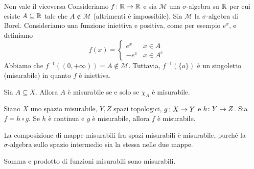 \documentclass[a4paper]{article}
\begin{document}
\begin{radioactive}
\begin{snippetexample}{Non vale il viceversa}
    Consideriamo \(f \colon \mathbb{R} \to \mathbb{R}\)
    e sia \(\mathcal M\) una \(\sigma\)-algebra
    su \(\mathbb{R}\) per cui esiste \(A\subseteq\mathbb{R}\) tale che \(A \notin \mathcal M\) (altrimenti è impossibile).
    Sia \(\mathcal M\) la \(\sigma\)-algebra di Borel.
    Consideriamo una funzione iniettiva e positiva, come per esempio \(e^x\), e definiamo
    \[
        f(x) =
        \begin{cases}
            e^x & x \in A \\
            -e^x & x \in A^c
        \end{cases}
    \]
    Abbiamo che \(f^{-1}((0, +\infty)) = A \notin \mathcal M\).
    Tuttavia, \(f^{-1}(\{a\})\) è un singoletto (misurabile) in quanto \(f\) è iniettiva.
\end{snippetexample}
\end{radioactive}

\begin{radioactive}
\begin{snippetproposition}{}
    Sia \(A \subseteq X\). Allora \(A\) è misurabile se e solo se
    \(\chi_A\) è misurabile.
\end{snippetproposition}
\end{radioactive}

\begin{radioactive}
\begin{snippetproposition}{}
    Siano \(X\) uno spazio misurabile,
    \(Y,Z\) spazi topologici,
    \(g \colon X \to Y\) e \(h \colon Y \to Z\).
    Sia \(f = h \circ g\). Se \(h\) è continua e \(g\) è misurabile, allora \(f\) è misurabile.
\end{snippetproposition}
\end{radioactive}

\begin{radioactive}
La composizione di mappe misurabili fra spazi misurabili è misurabile, purché
la \(\sigma\)-algebra sullo spazio intermedio sia la stessa nelle due mappe.
\end{radioactive}

\begin{radioactive}
\begin{snippetproposition}{}
    Somma e prodotto di funzioni misurabili sono misurabili.
\end{snippetproposition}
\end{radioactive}
\end{document}
